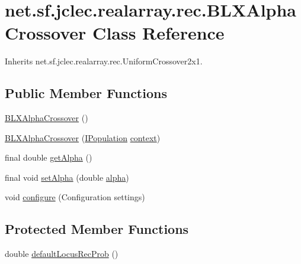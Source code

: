 \hypertarget{classnet_1_1sf_1_1jclec_1_1realarray_1_1rec_1_1_b_l_x_alpha_crossover}{\section{net.\-sf.\-jclec.\-realarray.\-rec.\-B\-L\-X\-Alpha\-Crossover Class Reference}
\label{classnet_1_1sf_1_1jclec_1_1realarray_1_1rec_1_1_b_l_x_alpha_crossover}
}


Inherits net.\-sf.\-jclec.\-realarray.\-rec.\-Uniform\-Crossover2x1.

\subsection*{Public Member Functions}
\begin{DoxyCompactItemize}
\item 
\hyperlink{classnet_1_1sf_1_1jclec_1_1realarray_1_1rec_1_1_b_l_x_alpha_crossover_a3f5cbb9827b1270f217c46e66d950d79}{B\-L\-X\-Alpha\-Crossover} ()
\item 
\hyperlink{classnet_1_1sf_1_1jclec_1_1realarray_1_1rec_1_1_b_l_x_alpha_crossover_aa6a07809ad3114c6d8f8636749e77043}{B\-L\-X\-Alpha\-Crossover} (\hyperlink{interfacenet_1_1sf_1_1jclec_1_1_i_population}{I\-Population} \hyperlink{classnet_1_1sf_1_1jclec_1_1base_1_1_abstract_recombinator_a580de9e9511dbb1d9042eb1089e767a7}{context})
\item 
final double \hyperlink{classnet_1_1sf_1_1jclec_1_1realarray_1_1rec_1_1_b_l_x_alpha_crossover_a389b0a0dd9dd57e396195ccf0ad5326c}{get\-Alpha} ()
\item 
final void \hyperlink{classnet_1_1sf_1_1jclec_1_1realarray_1_1rec_1_1_b_l_x_alpha_crossover_ad95c3d7bb01920d695dfab205eb82d89}{set\-Alpha} (double \hyperlink{classnet_1_1sf_1_1jclec_1_1realarray_1_1rec_1_1_b_l_x_alpha_crossover_a2eae05311a51136efa625d718bcb33b4}{alpha})
\item 
void \hyperlink{classnet_1_1sf_1_1jclec_1_1realarray_1_1rec_1_1_b_l_x_alpha_crossover_a19e22e8da08fe5dc86e6c256dc56fe18}{configure} (Configuration settings)
\end{DoxyCompactItemize}
\subsection*{Protected Member Functions}
\begin{DoxyCompactItemize}
\item 
double \hyperlink{classnet_1_1sf_1_1jclec_1_1realarray_1_1rec_1_1_b_l_x_alpha_crossover_a8d8cd581a6b2ea609c0eb5eb1c580b1a}{default\-Locus\-Rec\-Prob} ()
\end{DoxyCompactItemize}
